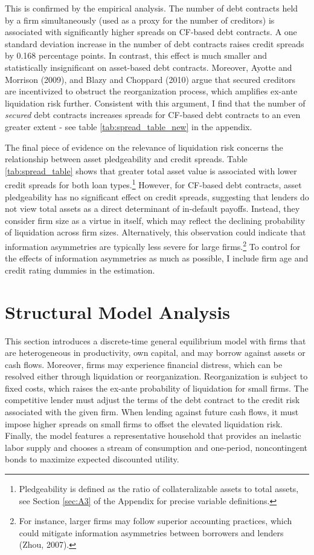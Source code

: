 \documentclass[12pt]{article}
\begin{document}
This is confirmed by the empirical analysis. The number of debt contracts held by a firm simultaneously (used as a proxy for the number of creditors) is associated with significantly higher spreads on CF-based debt contracts. A one standard deviation increase in the number of debt contracts raises credit spreads by 0.168 percentage points. In contrast, this effect is much smaller and statistically insignificant on asset-based debt contracts. Moreover, Ayotte and Morrison (2009), and Blazy and Choppard (2010) argue that secured creditors are incentivized to obstruct the reorganization process, which amplifies ex-ante liquidation risk further. Consistent with this argument, I find that the number of \textit{secured} debt contracts increases spreads for CF-based debt contracts to an even greater extent - see table \ref{tab:spread_table_new} in the appendix. 

The final piece of evidence on the relevance of liquidation risk concerns the relationship between asset pledgeability and credit spreads. Table \ref{tab:spread_table} shows that greater total asset value is associated with lower credit spreads for both loan types.\footnote{Pledgeability is defined as the ratio of collateralizable assets to total assets, see Section \ref{sec:A3} of the Appendix for precise variable definitions.} However, for CF-based debt contracts, asset pledgeability has no significant effect on credit spreads, suggesting that lenders do not view total assets as a direct determinant of in-default payoffs. Instead, they consider firm size as a virtue in itself, which 
may reflect the declining probability of liquidation across firm sizes. Alternatively, this observation could indicate that information asymmetries are typically less severe for large firms.\footnote{For instance, larger firms may follow superior accounting practices, which could mitigate information asymmetries between borrowers and lenders (Zhou, 2007).} To control for the effects of information asymmetries as much as possible, I include firm age and credit rating dummies in the estimation.

\section{Structural Model Analysis} \label{sec:model}
This section introduces a discrete-time general equilibrium model with firms that are heterogeneous in productivity, own capital, and may borrow against assets or cash flows. Moreover, firms may experience financial distress, which can be resolved either through liquidation or reorganization. Reorganization is subject to fixed costs, which raises the ex-ante probability of liquidation for small firms. The competitive lender must adjust the terms of the debt contract to the credit risk associated with the given firm. When lending against future cash flows, it must impose higher spreads on small firms to offset the elevated liquidation risk. Finally, the model features a representative household that provides an inelastic labor supply and chooses a stream of consumption and one-period, noncontingent bonds to maximize expected discounted utility.
\end{document}
